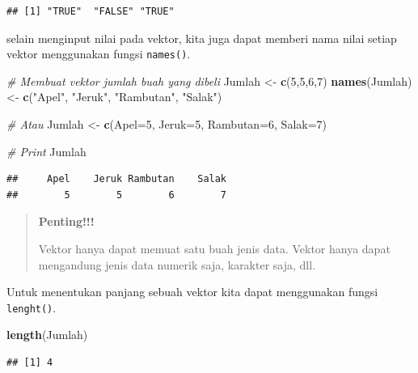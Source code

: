 \documentclass[
]{book}
\newenvironment{Shaded}{\begin{snugshade}}{\end{snugshade}}
\newcommand{\AttributeTok}[1]{\textcolor[rgb]{0.13,0.29,0.53}{#1}}
\newcommand{\CommentTok}[1]{\textcolor[rgb]{0.56,0.35,0.01}{\textit{#1}}}
\newcommand{\DecValTok}[1]{\textcolor[rgb]{0.00,0.00,0.81}{#1}}
\newcommand{\FunctionTok}[1]{\textcolor[rgb]{0.13,0.29,0.53}{\textbf{#1}}}
\newcommand{\NormalTok}[1]{#1}
\newcommand{\OtherTok}[1]{\textcolor[rgb]{0.56,0.35,0.01}{#1}}
\newcommand{\StringTok}[1]{\textcolor[rgb]{0.31,0.60,0.02}{#1}}
\theoremstyle{definition}
\theoremstyle{definition}
\theoremstyle{definition}
\theoremstyle{definition}
\theoremstyle{remark}
\begin{document}
\begin{verbatim}
## [1] "TRUE"  "FALSE" "TRUE"
\end{verbatim}

selain menginput nilai pada vektor, kita juga dapat memberi nama nilai setiap vektor menggunakan fungsi \texttt{names()}.

\begin{Shaded}
\begin{Highlighting}[]
\CommentTok{\# Membuat vektor jumlah buah yang dibeli}
\NormalTok{Jumlah }\OtherTok{\textless{}{-}} \FunctionTok{c}\NormalTok{(}\DecValTok{5}\NormalTok{,}\DecValTok{5}\NormalTok{,}\DecValTok{6}\NormalTok{,}\DecValTok{7}\NormalTok{)}
\FunctionTok{names}\NormalTok{(Jumlah) }\OtherTok{\textless{}{-}} \FunctionTok{c}\NormalTok{(}\StringTok{"Apel"}\NormalTok{, }\StringTok{"Jeruk"}\NormalTok{, }\StringTok{"Rambutan"}\NormalTok{, }\StringTok{"Salak"}\NormalTok{)}

\CommentTok{\# Atau}
\NormalTok{Jumlah }\OtherTok{\textless{}{-}} \FunctionTok{c}\NormalTok{(}\AttributeTok{Apel=}\DecValTok{5}\NormalTok{, }\AttributeTok{Jeruk=}\DecValTok{5}\NormalTok{, }\AttributeTok{Rambutan=}\DecValTok{6}\NormalTok{, }\AttributeTok{Salak=}\DecValTok{7}\NormalTok{)}

\CommentTok{\# Print}
\NormalTok{Jumlah}
\end{Highlighting}
\end{Shaded}

\begin{verbatim}
##     Apel    Jeruk Rambutan    Salak 
##        5        5        6        7
\end{verbatim}

\begin{quote}
\textbf{Penting!!!}

Vektor hanya dapat memuat satu buah jenis data. Vektor hanya dapat mengandung jenis data numerik saja, karakter saja, dll.
\end{quote}

Untuk menentukan panjang sebuah vektor kita dapat menggunakan fungsi \texttt{lenght()}.

\begin{Shaded}
\begin{Highlighting}[]
\FunctionTok{length}\NormalTok{(Jumlah)}
\end{Highlighting}
\end{Shaded}

\begin{verbatim}
## [1] 4
\end{verbatim}
\end{document}
